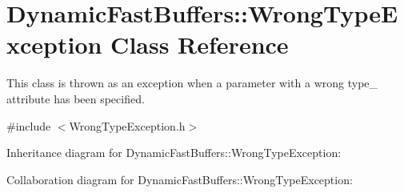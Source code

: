 \hypertarget{class_dynamic_fast_buffers_1_1_wrong_type_exception}{\section{Dynamic\-Fast\-Buffers\-:\-:Wrong\-Type\-Exception Class Reference}
\label{class_dynamic_fast_buffers_1_1_wrong_type_exception}
}


This class is thrown as an exception when a parameter with a wrong type\-\_\- attribute has been specified.  




{\ttfamily \#include $<$Wrong\-Type\-Exception.\-h$>$}



Inheritance diagram for Dynamic\-Fast\-Buffers\-:\-:Wrong\-Type\-Exception\-:


Collaboration diagram for Dynamic\-Fast\-Buffers\-:\-:Wrong\-Type\-Exception\-:
